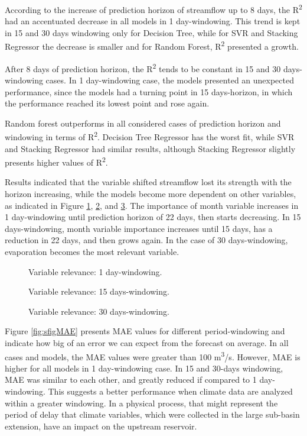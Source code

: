 \documentclass[12pt]{article}
\begin{document}
According to the increase of prediction horizon of streamflow up to 8 days, the R\textsuperscript{2} had an accentuated decrease in all models in 1 day-windowing. This trend is kept in 15 and 30 days windowing only for Decision Tree, while for SVR and Stacking Regressor the decrease is smaller and for Random Forest, R\textsuperscript{2} presented a growth.

After 8 days of prediction horizon, the R\textsuperscript{2} tends to be constant in 15 and 30 days-windowing cases. In 1 day-windowing case, the models presented an unexpected performance, since the models had a turning point in 15 days-horizon, in which the performance reached its lowest point and rose again.

Random forest outperforms in all considered cases of prediction horizon and windowing in terms of R\textsuperscript{2}. Decision Tree Regressor has the worst fit, while SVR and Stacking Regressor had similar results, although Stacking Regressor slightly presents higher values of R\textsuperscript{2}.

Results indicated that the variable shifted streamflow lost its strength with the horizon increasing, while the models become more dependent on other variables, as indicated in Figure \ref{fig:sfig1_relevance}, \ref{fig:sfig2_relevance}, and \ref{fig:sfig3_relevance}. The importance of month variable increases in 1 day-windowing until prediction horizon of 22 days, then starts decreasing. In 15 days-windowing, month variable importance increases until 15 days, has a reduction in 22 days, and then grows again.
In the case of 30 days-windowing, evaporation becomes the most relevant variable.

\begin{figure}[htbp]
  \centering
  
  \caption{Variable relevance: 1 day-windowing.}
  \label{fig:sfig1_relevance}
  \end{figure}

\begin{figure}[htbp]
  \centering
  
  \caption{Variable relevance: 15 days-windowing.}
  \label{fig:sfig2_relevance}
  \end{figure}

\begin{figure}[htbp]
  \centering
  
  \caption{Variable relevance: 30 days-windowing.}
  \label{fig:sfig3_relevance}
\end{figure}

Figure \ref{fig:sfigMAE} presents MAE values for different period-windowing and indicate how big of an error we can expect from the forecast on average. In all cases and models, the MAE values were greater than 100 m\textsuperscript{3}/s. However, MAE is higher for all models in 1 day-windowing case. In 15 and 30-days windowing, MAE was similar to each other, and greatly reduced if compared to 1 day-windowing. This suggests a better performance when climate data are analyzed within a greater windowing. In a physical process, that might represent the period of delay that climate variables, which were collected in the large sub-basin extension, have an impact on the upstream reservoir.
\end{document}
